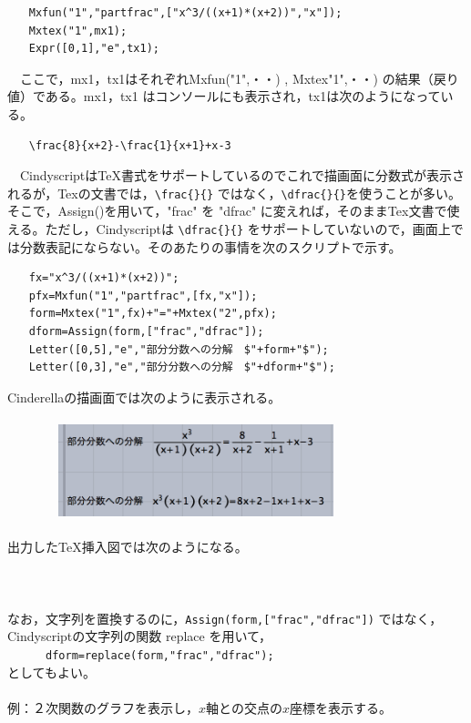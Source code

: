 \documentclass[papersize,a4paper,12pt,uplatex]{jsarticle}
\begin{document}
\begin{description}
\begin{verbatim}
　　Mxfun("1","partfrac",["x^3/((x+1)*(x+2))","x"]);
　　Mxtex("1",mx1);
　　Expr([0,1],"e",tx1);
\end{verbatim}
　ここで，mx1，tx1はそれぞれMxfun("1",・・) , Mxtex"1",・・) の結果（戻り値）である。mx1，tx1 はコンソールにも表示され，tx1は次のようになっている。
\begin{verbatim}
　　\frac{8}{x+2}-\frac{1}{x+1}+x-3 
\end{verbatim}
　CindyscriptはTeX書式をサポートしているのでこれで描画面に分数式が表示されるが，Texの文書では，\verb|\frac{}{}| ではなく，\verb|\dfrac{}{}|を使うことが多い。そこで，Assign()を用いて，"frac" を "dfrac" に変えれば，そのままTex文書で使える。ただし，Cindyscriptは \verb|\dfrac{}{}| をサポートしていないので，画面上では分数表記にならない。そのあたりの事情を次のスクリプトで示す。
\begin{verbatim}
　　fx="x^3/((x+1)*(x+2))";
　　pfx=Mxfun("1","partfrac",[fx,"x"]);
　　form=Mxtex("1",fx)+"="+Mxtex("2",pfx);
　　dform=Assign(form,["frac","dfrac"]);
　　Letter([0,5],"e","部分分数への分解　$"+form+"$");
　　Letter([0,3],"e","部分分数への分解　$"+dform+"$");
\end{verbatim}
Cinderellaの描画面では次のように表示される。\\
　\\
　　　　\includegraphics[bb=0 0 694 232 , width=8cm]{Fig/mxtex01.png}\\
　\\
出力したTeX挿入図では次のようになる。\\
　\\
　　\\
　\\
なお，文字列を置換するのに，\verb|Assign(form,["frac","dfrac"])| ではなく，\\
Cindyscriptの文字列の関数 replace を用いて，\\
　　　\verb|dform=replace(form,"frac","dfrac");| \\
としてもよい。\\
　\\
例：２次関数のグラフを表示し，$x$軸との交点の$x$座標を表示する。
\begin{verbatim}

\end{verbatim}
\end{description}
\end{document}

